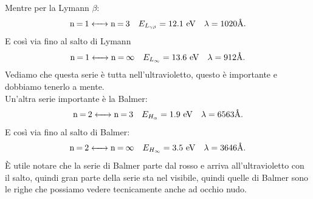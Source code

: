 Mentre per la Lymann $\beta $:
\begin{align*}
	&\ce{n = 1 <-> n = 3 }  & E_{L_{\gamma \beta  }} = 12.1 \text{ eV}& &\lambda = 1020 \text{\AA}
.\end{align*}
E così via fino al salto di Lymann
\begin{align*}
	&\ce{n = 1 <-> n = \infty }  & E_{L_{\infty}} = 13.6 \text{ eV}& &\lambda = 912 \text{\AA}
.\end{align*}
Vediamo che questa serie è tutta nell'ultravioletto, questo è importante e dobbiamo tenerlo a mente.\\
Un'altra serie importante è la Balmer:
\begin{align*}
	&\ce{n = 2 <-> n = 3 }  & E_{H_{\alpha }} = 1.9 \text{ eV}& &\lambda = 6563 \text{\AA}
.\end{align*}
E così via fino al salto di Balmer:
\begin{align*}
	&\ce{n = 2 <-> n = \infty }  & E_{H_{\infty }} = 3.5 \text{ eV}& &\lambda = 3646 \text{\AA}
.\end{align*}
È utile notare che la serie di Balmer parte dal rosso e arriva all'ultravioletto con il salto, quindi gran parte della serie sta nel visibile, quindi quelle di Balmer sono le righe che possiamo vedere tecnicamente anche ad occhio nudo.
